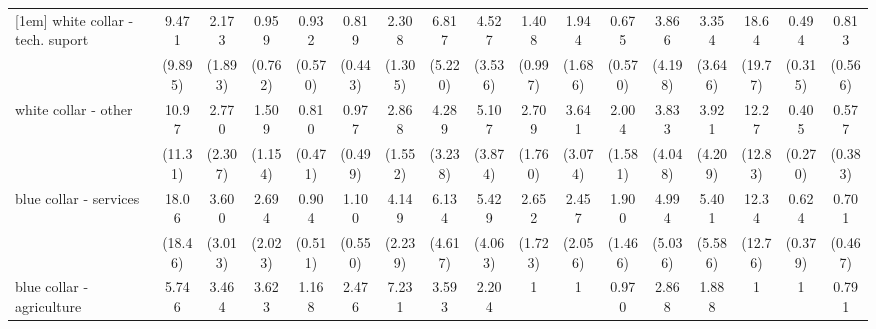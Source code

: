 {\begin{tabular}{l*{16}{c}}
[1em]
white collar - tech. suport&       9.471\sym{*}  &       2.173         &       0.959         &       0.932         &       0.819         &       2.308         &       6.817\sym{*}  &       4.527         &       1.408         &       1.944         &       0.675         &       3.866         &       3.354         &       18.64\sym{**} &       0.494         &       0.813         \\
                    &     (9.895)         &     (1.893)         &     (0.762)         &     (0.570)         &     (0.443)         &     (1.305)         &     (5.220)         &     (3.536)         &     (0.997)         &     (1.686)         &     (0.570)         &     (4.198)         &     (3.646)         &     (19.77)         &     (0.315)         &     (0.566)         \\
[1em]
white collar - other&       10.97\sym{*}  &       2.770         &       1.509         &       0.810         &       0.977         &       2.868         &       4.289         &       5.107\sym{*}  &       2.709         &       3.641         &       2.004         &       3.833         &       3.921         &       12.27\sym{*}  &       0.405         &       0.577         \\
                    &     (11.31)         &     (2.307)         &     (1.154)         &     (0.471)         &     (0.499)         &     (1.552)         &     (3.238)         &     (3.874)         &     (1.760)         &     (3.074)         &     (1.581)         &     (4.048)         &     (4.209)         &     (12.83)         &     (0.270)         &     (0.383)         \\
[1em]
blue collar - services&       18.06\sym{**} &       3.600         &       2.694         &       0.904         &       1.100         &       4.149\sym{**} &       6.134\sym{*}  &       5.429\sym{*}  &       2.652         &       2.457         &       1.900         &       4.994         &       5.401         &       12.34\sym{*}  &       0.624         &       0.701         \\
                    &     (18.46)         &     (3.013)         &     (2.023)         &     (0.511)         &     (0.550)         &     (2.239)         &     (4.617)         &     (4.063)         &     (1.723)         &     (2.056)         &     (1.466)         &     (5.036)         &     (5.586)         &     (12.76)         &     (0.379)         &     (0.467)         \\
[1em]
blue collar - agriculture&       5.746         &       3.464         &       3.623         &       1.168         &       2.476         &       7.231\sym{*}  &       3.593         &       2.204         &           1         &           1         &       0.970         &       2.868         &       1.888         &           1         &           1         &       0.791         \\

\end{tabular}}
